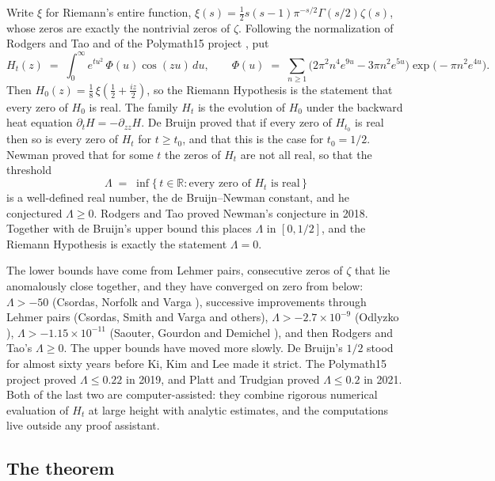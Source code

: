 \documentclass[11pt]{article}
\theoremstyle{definition}
\newcommand{\Lam}{\Lambda}
\newcommand{\Hfun}{H}
\newcommand{\R}{\mathbb{R}}
\begin{document}
Write $\xi$ for Riemann's entire function, $\xi(s) = \tfrac12 s(s-1)\pi^{-s/2}\Gamma(s/2)\zeta(s)$, whose zeros are exactly the nontrivial zeros of $\zeta$. Following the normalization of Rodgers and Tao \cite{RT} and of the Polymath15 project \cite{P15}, put
\begin{equation}\label{eq:H}
\Hfun_t(z) \;=\; \int_0^\infty e^{t u^2}\,\Phi(u)\cos(zu)\,du,
\qquad
\Phi(u) \;=\; \sum_{n \ge 1}\bigl(2\pi^2 n^4 e^{9u} - 3\pi n^2 e^{5u}\bigr)\exp\!\bigl(-\pi n^2 e^{4u}\bigr).
\end{equation}
Then $\Hfun_0(z) = \tfrac18\,\xi\!\left(\tfrac12 + \tfrac{iz}{2}\right)$, so the Riemann Hypothesis is the statement that every zero of $\Hfun_0$ is real. The family $\Hfun_t$ is the evolution of $\Hfun_0$ under the backward heat equation $\partial_t \Hfun = -\partial_{zz}\Hfun$. De Bruijn \cite{dB} proved that if every zero of $\Hfun_{t_0}$ is real then so is every zero of $\Hfun_t$ for $t \ge t_0$, and that this is the case for $t_0 = 1/2$. Newman \cite{Ne} proved that for some $t$ the zeros of $\Hfun_t$ are not all real, so that the threshold
\[
\Lam \;=\; \inf\{\,t \in \R : \text{every zero of } \Hfun_t \text{ is real}\,\}
\]
is a well-defined real number, the de Bruijn--Newman constant, and he conjectured $\Lam \ge 0$. Rodgers and Tao \cite{RT} proved Newman's conjecture in 2018. Together with de Bruijn's upper bound this places $\Lam$ in $[0, 1/2]$, and the Riemann Hypothesis is exactly the statement $\Lam = 0$.

The lower bounds have come from Lehmer pairs, consecutive zeros of $\zeta$ that lie anomalously close together, and they have converged on zero from below: $\Lam > -50$ (Csordas, Norfolk and Varga \cite{CNV}), successive improvements through Lehmer pairs (Csordas, Smith and Varga \cite{CSV} and others), $\Lam > -2.7 \times 10^{-9}$ (Odlyzko \cite{Od}), $\Lam > -1.15 \times 10^{-11}$ (Saouter, Gourdon and Demichel \cite{SGD}), and then Rodgers and Tao's $\Lam \ge 0$. The upper bounds have moved more slowly. De Bruijn's $1/2$ stood for almost sixty years before Ki, Kim and Lee \cite{KKL} made it strict. The Polymath15 project \cite{P15} proved $\Lam \le 0.22$ in 2019, and Platt and Trudgian \cite{PT} proved $\Lam \le 0.2$ in 2021. Both of the last two are computer-assisted: they combine rigorous numerical evaluation of $\Hfun_t$ at large height with analytic estimates, and the computations live outside any proof assistant.

\subsection{The theorem}
\end{document}
